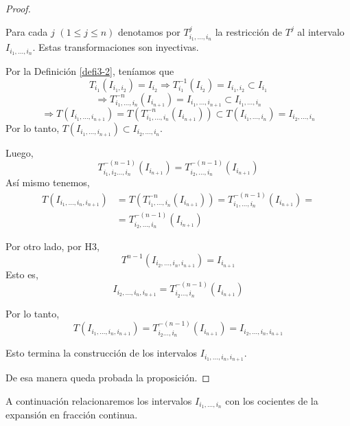 \begin{proof}
\begin{enumerate}
\begin{itemize}
        Para cada $j$ $(1\leq j\leq n)$ denotamos por $T^{j}_{i_{1},\ldots,i_{n}}$ la restricción de $T^{j}$ al intervalo $I_{i_{1},\ldots,i_{n}}$. Estas transformaciones son inyectivas.
        
        Por la Definición \ref{defi3-2}, teníamos que $$T_{i_{1}}(I_{i_{1},i_{2}})=I_{i_{2}}\Rightarrow T^{-1}_{i_{1}}(I_{i_{2}})=I_{i_{1},i_{2}}\subset I_{i_{1}}$$
        $$
        \Rightarrow T^{-n}_{i_{1},\ldots,i_{n}}(I_{i_{n+1}})=I_{i_{1},\ldots,i_{n+1}}\subset I_{i_{1},\ldots,i_{n}}
        $$
        $$
        \Rightarrow T(I_{i_{1},\ldots,i_{n+1}})=T(T^{-n}_{i_{1},\ldots,i_{n}}(I_{i_{n+1}})) \subset T(I_{i_{1},\ldots,i_{n}})=I_{i_{2},\ldots,i_{n}}
        $$
        Por lo tanto, $T(I_{i_{1},\ldots,i_{n+1}})\subset I_{i_{2},\ldots,i_{n}}$.
        
        Luego,
        $$
        T_{i_{1}, i_{2} \ldots, i_{n}}^{-(n-1)}\left(I_{i_{n+1}}\right)=T_{i_{2}, \ldots, i_{n}}^{-(n-1)}\left(I_{i_{n+1}}\right)
        $$
        Así mismo tenemos,
        $$
        \begin{aligned}
        T\left(I_{i_{1}, \ldots, i_{n}, i_{n+1}}\right) &=T\left(T_{i_{1}, \ldots, i_{n}}^{-n}\left(I_{i_{n+1}}\right)\right)=T_{i_{1}, \ldots, i_{n}}^{-(n-1)}\left(I_{i_{n+1}}\right)=\\
        &=T_{i_{2}, \ldots, i_{n}}^{-(n-1)}\left(I_{i_{n+1}}\right)
        \end{aligned}
        $$
        
        Por otro lado, por H3,
        $$
        T^{n-1}\left(I_{i_{2}, \ldots, i_{n}, i_{n+1}}\right)=I_{i_{n+1}}
        $$
        Esto es,
        $$
        I_{i_{2}, \ldots, i_{n}, i_{n+1}}=T_{i_{2} \ldots, i_{n}}^{-(n-1)}\left(I_{i_{n+1}}\right)
        $$
        
        Por lo tanto,
        $$
        T\left(I_{i_{1}, \ldots, i_{n}, i_{n+1}}\right)=T_{i_{2} \ldots, i_{n}}^{-(n-1)}\left(I_{i_{n+1}}\right)=I_{i_{2}, \ldots, i_{n}, i_{n+1}}
        $$
    \end{itemize}
    Esto termina la construcción de los intervalos $I_{i_{1}, \ldots, i_{n}, i_{n+1}}$.
\end{enumerate}
De esa manera queda probada la proposición.
\end{proof}

A continuación relacionaremos los intervalos $I_{i_{1},\ldots,i_{n}}$ con los cocientes de la expansión en fracción continua.

